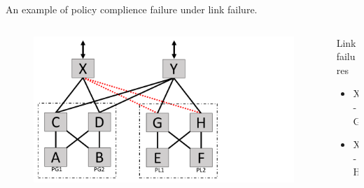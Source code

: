 \begin{frame}{An example of policy complience failure under link failure.}
    \begin{columns}
        \begin{column}{0.45\textwidth}
            \begin{figure}
                \includegraphics[width=1\textwidth,keepaspectratio,frame,clip,trim={0cm 0cm 9cm 0cm}]{figures/ex2_1_failed_links.pdf}
            \end{figure}
        \end{column}
        \begin{column}{0.50\textwidth}
            \begin{block}{Link failures}
                \begin{itemize}
                    \item X-G
                    \item X-H
                \end{itemize}
            \end{block}
        \end{column}
    \end{columns}
\end{frame}

